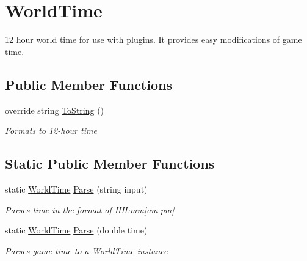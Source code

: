 \hypertarget{structOTA_1_1Command_1_1WorldTime}{}\section{World\+Time}
\label{structOTA_1_1Command_1_1WorldTime}


12 hour world time for use with plugins. It provides easy modifications of game time.  


\subsection*{Public Member Functions}
\begin{DoxyCompactItemize}
\item 
override string \hyperlink{structOTA_1_1Command_1_1WorldTime_aa73e7c4dd1df5fd5fbf81c7764ee1533}{To\+String} ()
\begin{DoxyCompactList}\small\item\em Formats to 12-\/hour time \end{DoxyCompactList}\end{DoxyCompactItemize}
\subsection*{Static Public Member Functions}
\begin{DoxyCompactItemize}
\item 
static \hyperlink{structOTA_1_1Command_1_1WorldTime}{World\+Time} \hyperlink{structOTA_1_1Command_1_1WorldTime_a65406242fe37b8d17383f657582df369}{Parse} (string input)
\begin{DoxyCompactList}\small\item\em Parses time in the format of H\+H\+:mm\mbox{[}am$\vert$pm\mbox{]} \end{DoxyCompactList}\item 
static \hyperlink{structOTA_1_1Command_1_1WorldTime}{World\+Time} \hyperlink{structOTA_1_1Command_1_1WorldTime_a41e751068ab07a228cb148f9414e599b}{Parse} (double time)
\begin{DoxyCompactList}\small\item\em Parses game time to a \hyperlink{structOTA_1_1Command_1_1WorldTime}{World\+Time} instance \end{DoxyCompactList}\end{DoxyCompactItemize}
